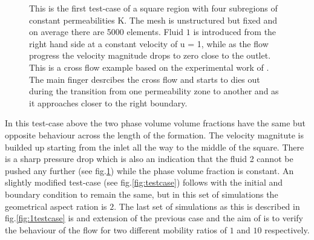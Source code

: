 \documentclass[preprint,authoryear,12pt]{elsarticle}
\begin{document}
\begin{figure}[h]
\begin{center}
\caption{This is the first test-case of a square region with four subregions of constant permeabilities K. The mesh is unstructured but fixed and on average there are 5000 elements. Fluid $1$ is introduced from the right hand side at a constant velocity of u = 1, while as the flow progress the velocity magnitude drops to zero close to the outlet. This is a cross flow example based on the experimental work of \citet{evans_1994}. The main finger desrcibes the cross flow and starts to dies out during the transition from one permeability zone to another and as it approaches closer to the right boundary.}
\label{fig:square}
\end{center}
\end{figure}

\noindent In this test-case above the two phase volume volume fractions have the same but opposite behaviour across the length of the formation. The velocity magnitute is builded up starting from the inlet all the way to the middle of the square. There is a sharp pressure drop which is also an indication that the fluid 2 cannot be pushed any further (see fig.\ref{fig:square}) while the phase volume fraction is constant. An slightly modified test-case (see fig.\ref{fig:testcase}) follows with the initial and boundary condition to remain the same, but in this set of simulations the geometrical aspect ration is $2$. The last set of simulations as this is described in fig.\ref{fig:1testcase} is and extension of the previous case and the aim of is to verify the behaviour of the flow for two different mobility ratios of $1$ and $10$ respectively.
\end{document}
